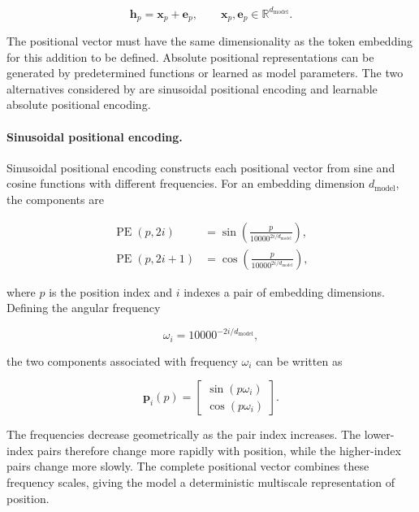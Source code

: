 \begin{equation}
    \mathbf{h}_p=\mathbf{x}_p+\mathbf{e}_p,
    \qquad
    \mathbf{x}_p,\mathbf{e}_p
    \in\mathbb{R}^{d_{\mathrm{model}}}.
    \label{eq:pe-absolute-addition}
\end{equation}

The positional vector must have the same dimensionality as the token
embedding for this addition to be defined. Absolute positional representations
can be generated by predetermined functions or learned as model parameters.
The two alternatives considered by \textcite{zhou2024rethinking} are
sinusoidal positional encoding and learnable absolute positional encoding.

\paragraph{Sinusoidal positional encoding.}
Sinusoidal positional encoding constructs each positional vector from sine
and cosine functions with different frequencies. For an embedding dimension
\(d_{\mathrm{model}}\), the components are

\begin{align}
    \operatorname{PE}(p,2i)
    &=
    \sin\left(
        \frac{p}{10000^{2i/d_{\mathrm{model}}}}
    \right),
    \label{eq:pe-sinusoidal-even}\\
    \operatorname{PE}(p,2i+1)
    &=
    \cos\left(
        \frac{p}{10000^{2i/d_{\mathrm{model}}}}
    \right),
    \label{eq:pe-sinusoidal-odd}
\end{align}

where \(p\) is the position index and \(i\) indexes a pair of embedding
dimensions. Defining the angular frequency

\begin{equation}
    \omega_i=10000^{-2i/d_{\mathrm{model}}},
    \label{eq:pe-sinusoidal-frequency}
\end{equation}

the two components associated with frequency \(\omega_i\) can be written as

\begin{equation}
    \mathbf{p}_i(p)=
    \begin{bmatrix}
        \sin(p\omega_i)\\
        \cos(p\omega_i)
    \end{bmatrix}.
    \label{eq:pe-sinusoidal-pair}
\end{equation}

The frequencies decrease geometrically as the pair index increases. The
lower-index pairs therefore change more rapidly with position, while the
higher-index pairs change more slowly. The complete positional vector
combines these frequency scales, giving the model a deterministic
multiscale representation of position.


